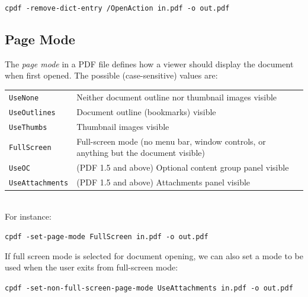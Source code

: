 \documentclass{book}
\begin{document}
  \begin{framed}
    \noindent\small\verb!cpdf -remove-dict-entry /OpenAction in.pdf -o out.pdf!
  \end{framed}

  \subsection{Page Mode}
  The \textit{page mode} in a PDF file defines how a viewer should display the
document when first opened. The possible (case-sensitive) values are:

\vspace{2mm}
  {\small\begin{tabular}{ll}
    \texttt{UseNone} & \vspace{2mm} \parbox{8cm}{Neither document outline nor thumbnail images visible} \\
    \texttt{UseOutlines} & \vspace{2mm} \parbox{8cm}{Document outline (bookmarks) visible} \\
    \texttt{UseThumbs} & \vspace{2mm} \parbox{8cm}{Thumbnail images visible} \\
    \texttt{FullScreen} & \vspace{2mm} \parbox{8cm}{Full-screen mode (no menu bar, window controls, or anything but the document visible)} \\
    \texttt{UseOC} & \vspace{2mm} \parbox{8cm}{(PDF 1.5 and above) Optional content group panel visible} \\
    \texttt{UseAttachments} & \vspace{2mm} \parbox{8cm}{(PDF 1.5 and above) Attachments panel visible}
  \end{tabular}}\\

  \noindent For instance:
  \begin{framed}
    \noindent\small\verb!cpdf -set-page-mode FullScreen in.pdf -o out.pdf!
  \end{framed}
  
  \noindent If full screen mode is selected for document opening, we can also set a mode to be used when the user exits from full-screen mode:
  \begin{framed}
    \noindent\small\verb!cpdf -set-non-full-screen-page-mode UseAttachments in.pdf -o out.pdf!
  \end{framed}
\end{document}
